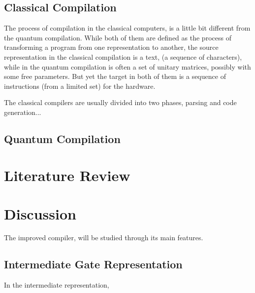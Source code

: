 \documentclass{book}
\begin{document}
\subsection{Classical Compilation}

The process of compilation in the classical computers, is a little bit different from the quantum compilation. While both of them are defined as the process of transforming a program from one representation to another, the source representation in the classical compilation is a text, (a sequence of characters), while in the quantum compilation is often a set of unitary matrices, possibly with some free parameters. But yet the target in both of them is a sequence of instructions (from a limited set) for the hardware.

The classical compilers are usually divided into two phases, parsing and code generation...

\subsection{Quantum Compilation}


\section{Literature Review}


\section{Discussion}

The improved compiler, will be studied through its main features.

\subsection{Intermediate Gate Representation}

In the intermediate representation, 
\end{document}
